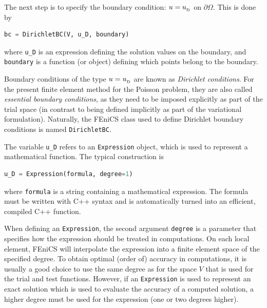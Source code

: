 \documentclass[graybox,envcountchap,sectrefs,final]{svmonodo}
\newenvironment{notice_mdfboxadmon}[1][]{
\begin{notice_mdfboxmdframed}[frametitle=#1]
}
{
\end{notice_mdfboxmdframed}
}
\begin{document}
The next step is to specify the boundary condition: $u=\ub$ on
$\partial\Omega$. This is done by

\begin{lstlisting}[language=Python,style=graycolor]
bc = DirichletBC(V, u_D, boundary)
\end{lstlisting}
where \Verb!u_D! is an expression defining the solution values on the
boundary, and \texttt{boundary} is a function (or object) defining
which points belong to the boundary.

Boundary conditions of the type $u=\ub$ are known as \emph{Dirichlet
conditions}. For the present finite element method for the Poisson
problem, they are also called \emph{essential boundary conditions}, as they
need to be imposed explicitly as part of the trial space (in contrast
to being defined implicitly as part of the variational formulation).
Naturally, the FEniCS class used to define Dirichlet boundary
conditions is named \texttt{DirichletBC}.


The variable \Verb!u_D! refers to an \texttt{Expression} object, which is used to
represent a mathematical function. The typical construction is

\begin{lstlisting}[language=Python,style=graycolor]
u_D = Expression(formula, degree=1)
\end{lstlisting}
where \texttt{formula} is a string containing a mathematical expression.
The formula must be written with C++ syntax and is
automatically turned into an efficient, compiled C++ function.

\begin{notice_mdfboxadmon}
When defining an \texttt{Expression}, the second argument \texttt{degree} is a
parameter that specifies how the expression should be treated in
computations. On each local element, FEniCS will interpolate the
expression into a finite element space
of the specified degree. To obtain optimal
(order of) accuracy in computations, it is usually a good choice to
use the same degree as for the space $V$ that is used for the trial
and test functions. However, if an \texttt{Expression} is used to represent
an exact solution which is used to evaluate the accuracy of a computed
solution, a higher degree must be used for the expression (one or two
degrees higher).
\end{notice_mdfboxadmon} %
\end{document}
